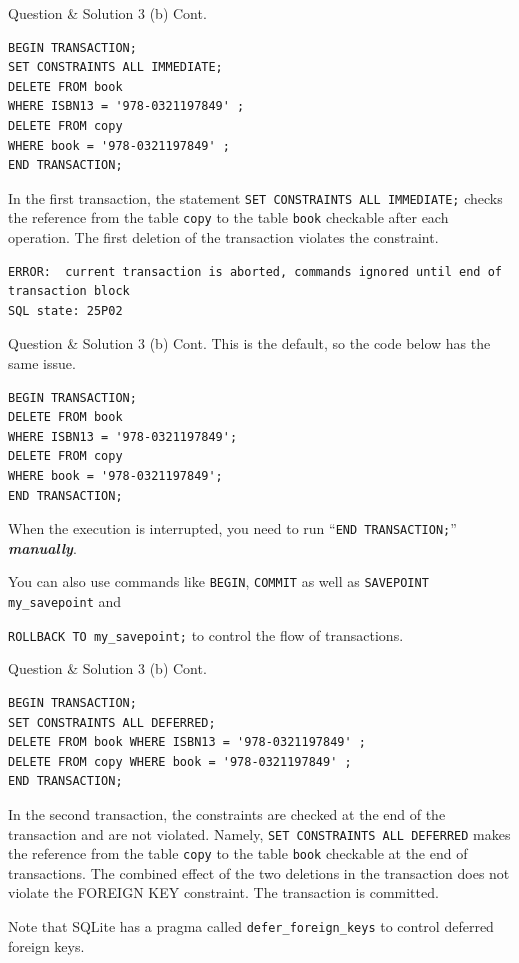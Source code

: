 \begin{frame}[fragile]{Question \& Solution 3 (b) Cont.}
\begin{lstlisting}
BEGIN TRANSACTION;
SET CONSTRAINTS ALL IMMEDIATE;
DELETE FROM book 
WHERE ISBN13 = '978-0321197849' ;
DELETE FROM copy 
WHERE book = '978-0321197849' ;
END TRANSACTION;
\end{lstlisting}

In the first transaction, the statement \texttt{SET CONSTRAINTS ALL IMMEDIATE;} checks the reference from the table \texttt{copy} to the table \texttt{book} checkable after each operation. The first deletion of the transaction violates the constraint.

\begin{lstlisting}[style=error]
ERROR:  current transaction is aborted, commands ignored until end of transaction block
SQL state: 25P02
\end{lstlisting}

\end{frame}


\begin{frame}[fragile]{Question \& Solution 3 (b) Cont.}
This is the default, so the code below has the same issue.

\begin{lstlisting}
BEGIN TRANSACTION;
DELETE FROM book 
WHERE ISBN13 = '978-0321197849';
DELETE FROM copy 
WHERE book = '978-0321197849';
END TRANSACTION;
\end{lstlisting}

When the execution is interrupted, you need to run ``\texttt{END TRANSACTION;}'' {\color{red} \textbf{\textit{manually}}}. \vspace{10pt}

You can also use commands like \texttt{BEGIN}, \texttt{COMMIT} as well as  \texttt{SAVEPOINT my\_savepoint} and 

\texttt{ROLLBACK TO my\_savepoint;} to control the flow of transactions.

\end{frame}


\begin{frame}[fragile]{Question \& Solution 3 (b) Cont.}

\begin{lstlisting}
BEGIN TRANSACTION;
SET CONSTRAINTS ALL DEFERRED;
DELETE FROM book WHERE ISBN13 = '978-0321197849' ;
DELETE FROM copy WHERE book = '978-0321197849' ;
END TRANSACTION;
\end{lstlisting}

In the second transaction, the constraints are checked at the end of the transaction and are not violated.  Namely, \texttt{SET CONSTRAINTS ALL DEFERRED} makes the reference from the table \texttt{copy} to the table \texttt{book} checkable at the end of transactions. The combined effect of the two deletions in the transaction does not violate the FOREIGN KEY constraint. The transaction is committed. \vspace{10pt}

Note that SQLite has a pragma called \texttt{defer\_foreign\_keys} to control deferred foreign keys.
\end{frame}


